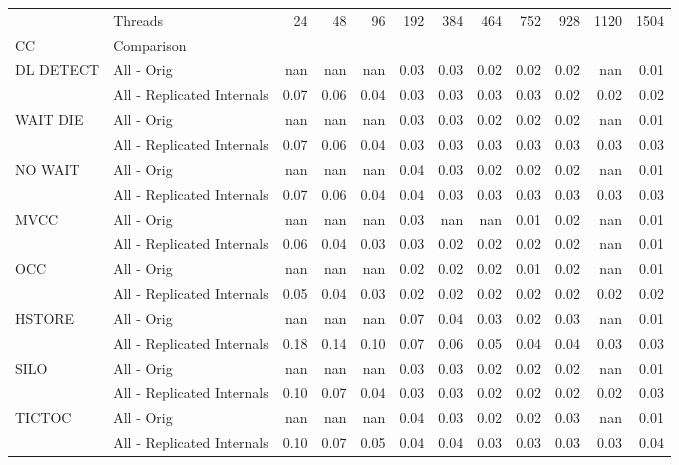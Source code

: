 \begin{tabular}{llrrrrrrrrrr}
\toprule
       & Threads &  24   &  48   &  96   &  192  &  384  &  464  &  752  &  928  &  1120 &  1504 \\
CC & Comparison &       &       &       &       &       &       &       &       &       &       \\
\midrule
DL DETECT & All - Orig &   nan &   nan &   nan &  0.03 &  0.03 &  0.02 &  0.02 &  0.02 &   nan &  0.01 \\
       & All - Replicated Internals &  0.07 &  0.06 &  0.04 &  0.03 &  0.03 &  0.03 &  0.03 &  0.02 &  0.02 &  0.02 \\
WAIT DIE & All - Orig &   nan &   nan &   nan &  0.03 &  0.03 &  0.02 &  0.02 &  0.02 &   nan &  0.01 \\
       & All - Replicated Internals &  0.07 &  0.06 &  0.04 &  0.03 &  0.03 &  0.03 &  0.03 &  0.03 &  0.03 &  0.03 \\
NO WAIT & All - Orig &   nan &   nan &   nan &  0.04 &  0.03 &  0.02 &  0.02 &  0.02 &   nan &  0.01 \\
       & All - Replicated Internals &  0.07 &  0.06 &  0.04 &  0.04 &  0.03 &  0.03 &  0.03 &  0.03 &  0.03 &  0.03 \\
MVCC & All - Orig &   nan &   nan &   nan &  0.03 &   nan &   nan &  0.01 &  0.02 &   nan &  0.01 \\
       & All - Replicated Internals &  0.06 &  0.04 &  0.03 &  0.03 &  0.02 &  0.02 &  0.02 &  0.02 &   nan &  0.01 \\
OCC & All - Orig &   nan &   nan &   nan &  0.02 &  0.02 &  0.02 &  0.01 &  0.02 &   nan &  0.01 \\
       & All - Replicated Internals &  0.05 &  0.04 &  0.03 &  0.02 &  0.02 &  0.02 &  0.02 &  0.02 &  0.02 &  0.02 \\
HSTORE & All - Orig &   nan &   nan &   nan &  0.07 &  0.04 &  0.03 &  0.02 &  0.03 &   nan &  0.01 \\
       & All - Replicated Internals &  0.18 &  0.14 &  0.10 &  0.07 &  0.06 &  0.05 &  0.04 &  0.04 &  0.03 &  0.03 \\
SILO & All - Orig &   nan &   nan &   nan &  0.03 &  0.03 &  0.02 &  0.02 &  0.02 &   nan &  0.01 \\
       & All - Replicated Internals &  0.10 &  0.07 &  0.04 &  0.03 &  0.03 &  0.02 &  0.02 &  0.02 &  0.02 &  0.03 \\
TICTOC & All - Orig &   nan &   nan &   nan &  0.04 &  0.03 &  0.02 &  0.02 &  0.03 &   nan &  0.01 \\
       & All - Replicated Internals &  0.10 &  0.07 &  0.05 &  0.04 &  0.04 &  0.03 &  0.03 &  0.03 &  0.03 &  0.04 \\
\bottomrule
\end{tabular}
